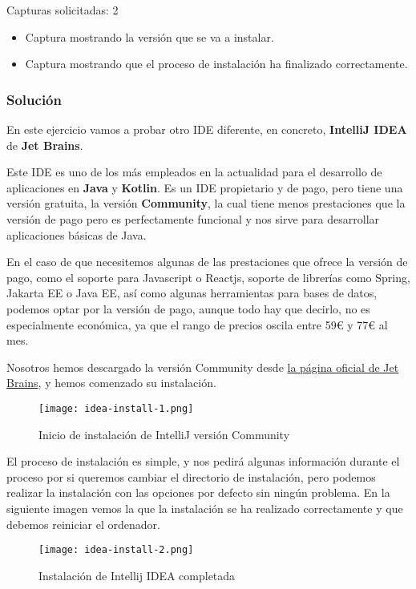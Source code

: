 Capturas solicitadas: 2
\begin{itemize}
    \item Captura mostrando la versión que se va a instalar.
    \item Captura mostrando que el proceso de instalación ha finalizado correctamente.
\end{itemize}

\subsubsection{Solución}
En este ejercicio vamos a probar otro IDE diferente, en concreto, \textbf{IntelliJ IDEA} de \textbf{Jet Brains}.

Este IDE es uno de los más empleados en la actualidad para el desarrollo de aplicaciones en \textbf{Java} y \textbf{Kotlin}. Es un  IDE propietario y de pago, pero tiene una versión gratuita, la versión \textbf{Community}, la cual tiene menos prestaciones que la versión de pago pero es perfectamente funcional y nos sirve para desarrollar aplicaciones básicas de Java. \cite{intell01}

En el caso de que necesitemos algunas de las prestaciones que ofrece la versión de pago, como el soporte para Javascript o Reactjs, soporte de librerías como Spring, Jakarta EE o Java EE, así como algunas herramientas para bases de datos, podemos optar por la versión de pago, aunque todo hay que decirlo, no es especialmente económica, ya que el rango de precios oscila entre 59€ y 77€ al mes. \cite{intell02}

Nosotros hemos descargado la versión Community desde \href{https://www.jetbrains.com/idea/download/#section=windows}{la página oficial de Jet Brains}, y hemos comenzado su instalación.

\begin{figure}[ht]
    \centering
    \texttt{[image: idea-install-1.png]}
    \caption{Inicio de instalación de IntelliJ versión Community}
\end{figure}

El proceso de instalación es simple, y nos pedirá algunas información durante el proceso por si queremos cambiar el directorio de instalación, pero podemos realizar la instalación con las opciones por defecto sin ningún problema. En la siguiente imagen vemos la que la instalación se ha realizado correctamente y que debemos reiniciar el ordenador.

\begin{figure}[ht]
    \centering
    \texttt{[image: idea-install-2.png]}
    \caption{Instalación de Intellij IDEA completada}
\end{figure}

